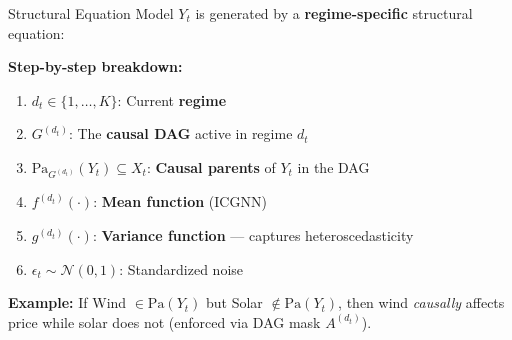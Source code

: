 \documentclass[aspectratio=169]{beamer}
\begin{document}
\begin{frame}{Structural Equation Model}
$Y_t$ is generated by a \textbf{regime-specific} structural equation:

\vspace{0.2cm}
\begin{center}
\end{center}

\vspace{0.2cm}
\textbf{Step-by-step breakdown:}
\begin{enumerate}
    \item $d_t \in \{1, \ldots, K\}$: Current \textbf{regime} %
    \item $G^{(d_t)}$: The \textbf{causal DAG} active in regime $d_t$
    \item $\mathrm{Pa}_{G^{(d_t)}}(Y_t) \subseteq X_t$: \textbf{Causal parents} of $Y_t$ in the DAG
    \item $f^{(d_t)}(\cdot)$: \textbf{Mean function} (ICGNN) %
    \item $g^{(d_t)}(\cdot)$: \textbf{Variance function} --- captures heteroscedasticity
    \item $\epsilon_t \sim \mathcal{N}(0,1)$: Standardized noise
\end{enumerate}

\vspace{0.2cm}
\textbf{Example:} If Wind $\in \text{Pa}(Y_t)$ but Solar $\notin \text{Pa}(Y_t)$, then wind \textit{causally} affects price while solar does not (enforced via DAG mask $A^{(d_t)}$).
\end{frame}
\end{document}
